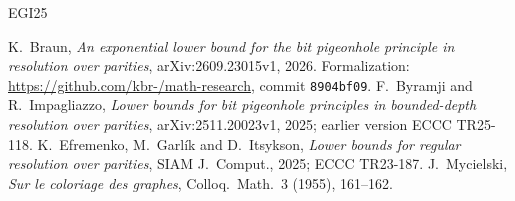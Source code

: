 \documentclass[11pt]{article}
\theoremstyle{remark}
\begin{document}
\begin{footnotesize}
\end{footnotesize}

\begin{thebibliography}{EGI25}\raggedright
{} K.~Braun, \emph{An exponential lower bound for the bit
pigeonhole principle in resolution over parities}, arXiv:2609.23015v1, 2026.
Formalization: \url{https://github.com/kbr-/math-research}, commit
\texttt{8904bf09}.
 F.~Byramji and R.~Impagliazzo, \emph{Lower bounds for bit
pigeonhole principles in bounded-depth resolution over parities},
arXiv:2511.20023v1, 2025; earlier version ECCC TR25-118.
 K.~Efremenko, M.~Garl\'ik and D.~Itsykson, \emph{Lower
bounds for regular resolution over parities}, SIAM J.\ Comput., 2025; ECCC
TR23-187.
 J.~Mycielski, \emph{Sur le coloriage des graphes},
Colloq.\ Math.\ 3 (1955), 161--162.
\end{thebibliography}
\end{document}

